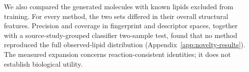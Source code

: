 We also compared the generated molecules with known lipids excluded from training. For every
method, the two sets differed in their overall structural features.
Precision and coverage in fingerprint and descriptor spaces, together with a source-study-grouped classifier
two-sample test, found that no method reproduced the full observed-lipid distribution
(Appendix~\ref{app:novelty-results}). The measured expansion concerns reaction-consistent identities;
it does not establish biological utility.


